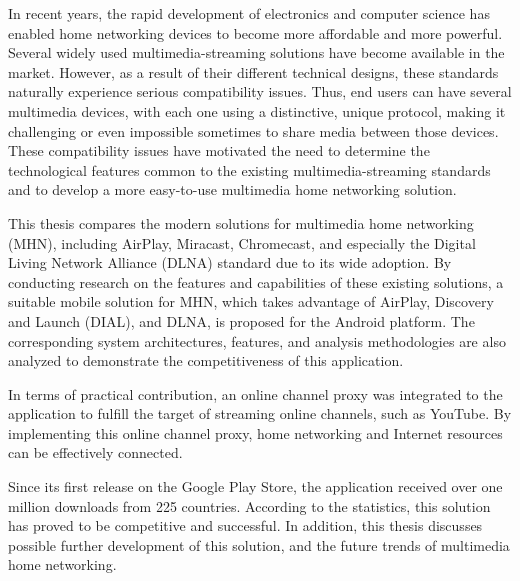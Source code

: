 In recent years, the rapid development of electronics and computer science has
enabled home networking devices to become more affordable and more powerful. 
Several widely used multimedia-streaming solutions have become available in the
market. However, as a result of their different technical designs, these
standards naturally experience serious compatibility issues. Thus, end users can
have several multimedia devices, with each one using a distinctive, unique
protocol, making it challenging or even impossible sometimes to share media
between those devices. These compatibility issues have motivated the need to
determine the technological features common to the existing
multimedia-streaming standards and to develop a more easy-to-use multimedia
home networking solution.

This thesis compares the modern solutions for multimedia home networking (MHN),
including AirPlay, Miracast, Chromecast, and especially the Digital Living
Network Alliance (DLNA) standard due to its wide adoption. By conducting
research on the features and capabilities of these existing solutions, a
suitable mobile solution for MHN, which takes advantage of AirPlay, Discovery
and Launch (DIAL), and DLNA, is proposed for the Android platform. The
corresponding system architectures, features, and analysis methodologies are
also analyzed to demonstrate the competitiveness of this application.

In terms of practical contribution, an online channel proxy was integrated to
the application to fulfill the target of streaming online channels, such as
YouTube. By implementing this online channel proxy, home networking and
Internet resources can be effectively connected.

Since its first release on the Google Play Store, the application received over
one million downloads from 225 countries. According to the statistics, this
solution has proved to be competitive and successful. In addition, this thesis
discusses possible further development of this solution, and the future trends
of multimedia home networking.
